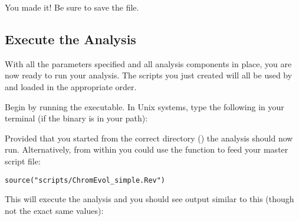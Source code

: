{\begin{framed}
You made it! Be sure to save the file.
\end{framed}}

\bigskip
\subsection{Execute the \RevBayes Analysis}\label{subsect:Exercise-RunMCMC}

With all the parameters specified and all analysis components in place, you are now ready to run your analysis. 
The \Rev scripts you just created will all be used by \RevBayes and loaded in the appropriate order.

{\begin{framed}
Begin by running the \RevBayes executable. In Unix systems, type the following in your terminal (if the \RevBayes binary is in your path):

\colorbox{black}{\strut\hspace{1mm}\textcolor[rgb]{0,1,1}{}\hspace{0.6\textwidth}}
\end{framed}}

Provided that you started \RevBayes from the correct directory () the analysis should now run. Alternatively, from within \RevBayes you could use the  function to feed \RevBayes your master script file:
{\tt \begin{snugshade*}
\begin{lstlisting}
source("scripts/ChromEvol_simple.Rev")
\end{lstlisting}
\end{snugshade*}}

This will execute the analysis and you should see output similar to this (though not the exact same values):


